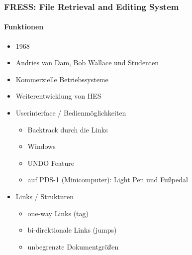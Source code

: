 \begin{frame}
\frametitle{FRESS: File Retrieval and Editing System}
\framesubtitle{Funktionen}
\begin{itemize}
	\item 1968
	\item Andries van Dam, Bob Wallace und Studenten
	\item Kommerzielle Betriebssysteme
	\item Weiterentwicklung von HES
	\item Userinterface / Bedienmöglichkeiten
	\begin{itemize}
		\item Backtrack durch die Links
		\item Windows
		\item UNDO Feature
		\item auf PDS-1 (Minicomputer): Light Pen und Fußpedal
	\end{itemize}
	\item Links / Strukturen
	\begin{itemize}
		\item one-way Links (tag)
		\item bi-direktionale Links (jumps)
		\item unbegrenzte Dokumentgrößen
	\end{itemize}
\end{itemize}
\end{frame}
